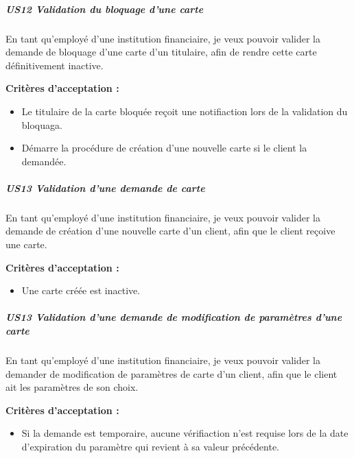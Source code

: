 \hypertarget{us12-validation-du-bloquage-dune-carte}{%
\subparagraph{US12 Validation du bloquage d'une
carte}\label{us12-validation-du-bloquage-dune-carte}}

En tant qu'employé d'une institution financiaire, je veux pouvoir
valider la demande de bloquage d'une carte d'un titulaire, afin de
rendre cette carte définitivement inactive.

\textbf{Critères d'acceptation :}

\begin{itemize}
\tightlist
\item
  Le titulaire de la carte bloquée reçoit une notifiaction lors de la
  validation du bloquaga.
\item
  Démarre la procédure de création d'une nouvelle carte si le client la
  demandée.
\end{itemize}

\hypertarget{us13-validation-dune-demande-de-carte}{%
\subparagraph{US13 Validation d'une demande de
carte}\label{us13-validation-dune-demande-de-carte}}

En tant qu'employé d'une institution financiaire, je veux pouvoir
valider la demande de création d'une nouvelle carte d'un client, afin
que le client reçoive une carte.

\textbf{Critères d'acceptation :}

\begin{itemize}
\tightlist
\item
  Une carte créée est inactive.
\end{itemize}

\hypertarget{us13-validation-dune-demande-de-modification-de-paramuxe8tres-dune-carte}{%
\subparagraph{US13 Validation d'une demande de modification de
paramètres d'une
carte}\label{us13-validation-dune-demande-de-modification-de-paramuxe8tres-dune-carte}}

En tant qu'employé d'une institution financiaire, je veux pouvoir
valider la demander de modification de paramètres de carte d'un client,
afin que le client ait les paramètres de son choix.

\textbf{Critères d'acceptation :}

\begin{itemize}
\tightlist
\item
  Si la demande est temporaire, aucune vérifiaction n'est requise lors
  de la date d'expiration du paramètre qui revient à sa valeur
  précédente.
\end{itemize}


